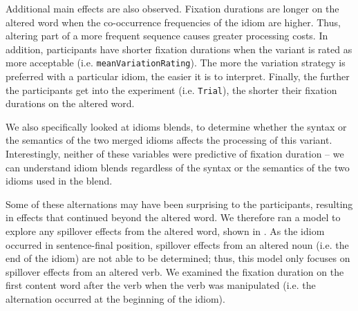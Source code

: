 \documentclass[output=paper
,modfonts
,nonflat]{langsci/langscibook}
\begin{document}
Additional main effects are also observed. Fixation durations are longer on the altered word when the co-occurrence frequencies of the idiom are higher. Thus, altering part of a more frequent sequence causes greater processing costs. In addition, participants have shorter fixation durations when the variant is rated as more acceptable (i.e. \texttt{meanVariationRating}). The more the variation strategy is preferred with a particular idiom, the easier it is to interpret. Finally, the further the participants get into the experiment (i.e. \texttt{Trial}), the shorter their fixation durations on the altered word. 

We also specifically looked at idioms blends, to determine whether the syntax or the semantics of the two merged idioms affects the processing of this variant. Interestingly, neither of these variables were predictive of fixation duration -- we can understand idiom blends regardless of the syntax or the semantics of the two idioms used in the blend.




Some of these alternations may have been surprising to the participants, resulting in effects that continued beyond the altered word. We therefore ran a model to explore any spillover effects from the altered word, shown in . As the idiom occurred in sentence-final position, spillover effects from an altered noun (i.e. the end of the idiom) are not able to be determined; thus, this model only focuses on spillover effects from an altered verb. We examined the fixation duration on the first content word after the verb when the verb was manipulated (i.e. the alternation occurred at the beginning of the idiom).  
\end{document}
